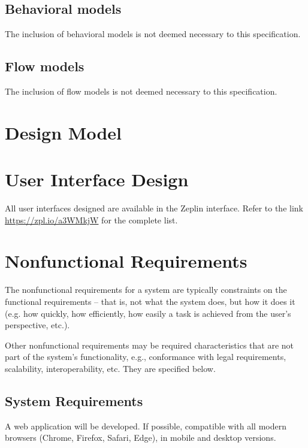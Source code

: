 \subsection{Behavioral models}
\label{appendix:srs:behavioral-models}

The inclusion of behavioral models is not deemed necessary to this specification.

\subsection{Flow models}
\label{appendix:srs:flow-models}

The inclusion of flow models is not deemed necessary to this specification.

\section{Design Model}
\label{appendix:srs:design-models}

\section{User Interface Design}
\label{appendix:user-interface-design}

All user interfaces designed are available in the Zeplin interface. Refer to the link \url{https://zpl.io/a3WMkjW} for the complete list.

\section{Nonfunctional Requirements}
\label{appendix:srs:nonfunctional-requirements}

The nonfunctional requirements for a system are typically constraints on the functional requirements – that is, not what the system does, but how it does it (e.g. how quickly, how efficiently, how easily a task is achieved from the user’s perspective, etc.).

Other nonfunctional requirements may be required characteristics that are not part of the system’s functionality, e.g., conformance with legal requirements, scalability, interoperability, etc. They are specified below.

\subsection{System Requirements}

A web application will be developed. If possible, compatible with all modern browsers (Chrome, Firefox, Safari, Edge), in mobile and desktop versions.

